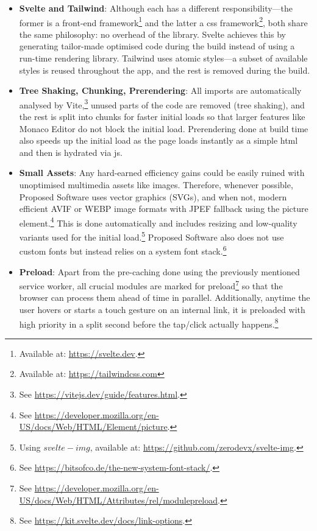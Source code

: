\begin{itemize}
    \item \textbf{Svelte and Tailwind}: Although each has a different responsibility---the former is a front-end framework\footnote{Available at: \url{https://svelte.dev}.} and the latter a \gls{css} framework\footnote{Available at: \url{https://tailwindcss.com}}, both share the same philosophy: no overhead of the library. Svelte achieves this by generating tailor-made optimised code during the build instead of using a run-time rendering library. Tailwind uses atomic styles---a subset of available styles is reused throughout the app, and the rest is removed during the build.
    \item \textbf{Tree Shaking, Chunking, Prerendering}: All imports are automatically analysed by Vite,\footnote{See \url{https://vitejs.dev/guide/features.html}.} unused parts of the code are removed (tree shaking), and the rest is split into chunks for faster initial loads so that larger features like Monaco Editor do not block the initial load. Prerendering done at build time also speeds up the initial load as the page loads instantly as a simple \gls{html} and then is hydrated via \gls{js}.
    \item \textbf{Small Assets}: Any hard-earned efficiency gains could be easily ruined with unoptimised multimedia assets like images. Therefore, whenever possible, Proposed Software uses vector graphics (SVGs), and when not, modern efficient AVIF or WEBP image formats with JPEF fallback using the picture element.\footnote{See \url{https://developer.mozilla.org/en-US/docs/Web/HTML/Element/picture}.} This is done automatically and includes resizing and low-quality variants used for the initial load.\footnote{Using $svelte-img$, available at: \url{https://github.com/zerodevx/svelte-img}.} Proposed Software also does not use custom fonts but instead relies on a system font stack.\footnote{See \url{https://bitsofco.de/the-new-system-font-stack/}.}
    \item \textbf{Preload}: Apart from the pre-caching done using the previously mentioned service worker, all crucial modules are marked for preload\footnote{See \url{https://developer.mozilla.org/en-US/docs/Web/HTML/Attributes/rel/modulepreload}.} so that the browser can process them ahead of time in parallel. Additionally, anytime the user hovers or starts a touch gesture on an internal link, it is preloaded with high priority in a split second before the tap/click actually happens.\footnote{See \url{https://kit.svelte.dev/docs/link-options}.}
\end{itemize}

